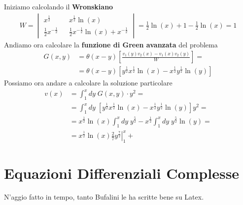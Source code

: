 Iniziamo calcolando il \textbf{Wronskiano}
\begin{align}
	 W = \begin{vmatrix}
	x^\frac{1}{2} && x^\frac{1}{2} \ln(x) \\
	\frac{1}{2}x^{-\frac{1}{2}} && \frac{1}{2}x^{-\frac{1}{2}} \ln(x) + x^{-\frac{1}{2}}
\end{vmatrix} = \frac{1}{2} \ln(x) + 1 - \frac{1}{2}\ln(x) = 1
\end{align}
Andiamo ora calcolare la \textbf{funzione di Green avanzata} del problema
\begin{align}
	G(x,y) &= \theta(x-y)\left[ \frac{v_1(y) v_2(x) -v_1(x)v_2(y)}{W} \right] = \nonumber \\
	&= \theta(x-y)\left[y^\frac{1}{2} x^\frac{1}{2} \ln(x) - x^\frac{1}{2} y^\frac{1}{2}\ln(y) \right] 
\end{align}
Possiamo ora andare a calcolare la soluzione particolare
\begin{align}
	v(x) &= \int_{1}^{x} dy \; G(x,y) \cdot y^2 = \nonumber\\
		 &= \int_{1}^{x} dy \; \left[y^\frac{1}{2} x^\frac{1}{2} \ln(x) - x^\frac{1}{2} y^\frac{1}{2}\ln(y) \right] y^2 = \nonumber\\
		 &= x^\frac{1}{2} \ln(x)\int_{1}^{x} dy \;y^\frac{5}{2} - x^\frac{1}{2}\int_{1}^{x} dy \; y^\frac{5}{2}\ln(y)  = \nonumber\\
		 &= x^\frac{1}{2} \ln(x) \left.\frac{2}{7}y^{\frac{7}{2}} \right|_1^x + 
\end{align}

\newpage
\section{Equazioni Differenziali Complesse}

N'aggio fatto in tempo, tanto Bufalini le ha scritte bene su Latex.